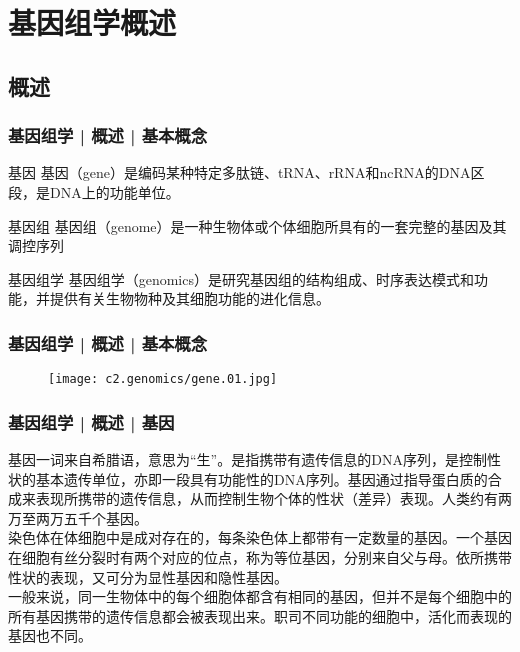 \section{基因组学概述}
\subsection{概述}
\begin{frame}
  \frametitle{基因组学 | 概述 | 基本概念}
  \begin{block}{基因}
基因（gene）是编码某种特定多肽链、tRNA、rRNA和ncRNA的DNA区段，是DNA上的功能单位。
  \end{block}
  \pause
  \begin{block}{基因组}
 基因组（genome）是一种生物体或个体细胞所具有的一套完整的基因及其调控序列 
  \end{block}
  \pause
  \begin{block}{基因组学}
 基因组学（genomics）是研究基因组的结构组成、时序表达模式和功能，并提供有关生物物种及其细胞功能的进化信息。 
  \end{block}
\end{frame}

\begin{frame}
  \frametitle{基因组学 | 概述 | 基本概念}
  \begin{figure}
    \centering
    \texttt{[image: c2.genomics/gene.01.jpg]}
  \end{figure}
\end{frame}

\begin{frame}
  \frametitle{基因组学 | 概述 | 基因}
基因一词来自希腊语，意思为“生”。是指携带有遗传信息的DNA序列，是控制性状的基本遗传单位，亦即一段具有功能性的DNA序列。基因通过指导蛋白质的合成来表现所携带的遗传信息，从而控制生物个体的性状（差异）表现。人类约有两万至两万五千个基因。\\
\vspace{1em}
染色体在体细胞中是成对存在的，每条染色体上都带有一定数量的基因。一个基因在细胞有丝分裂时有两个对应的位点，称为等位基因，分别来自父与母。依所携带性状的表现，又可分为显性基因和隐性基因。\\
\vspace{1em}
一般来说，同一生物体中的每个细胞体都含有相同的基因，但并不是每个细胞中的所有基因携带的遗传信息都会被表现出来。职司不同功能的细胞中，活化而表现的基因也不同。
\end{frame}

